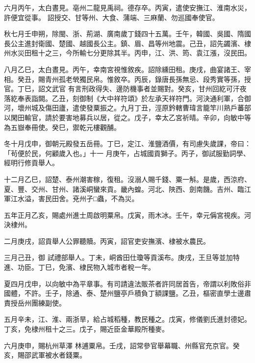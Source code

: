 \begin{pinyinscope}
 六月丙午，太白晝見。亳州二龍見禹祠。德存卒。丙寅，遣使安撫江、淮南水災，許便宜從事。
 詔授交、甘等州、大食、蒲端、三麻蘭、勿巡國奉使官。



 秋七月壬申朔，除閩、浙、荊湖、廣南歲丁錢四十五萬。壬午，韓國、吳國、隋國長公主進封衛國、楚國、越國長公主。鎮、眉、昌等州地震。己丑，詔先蠲濱、棣州水災田租十之三，今所輸七分更除其半。丙申，江、洪、筠、袁江漲，沒民田。



 八月乙巳，太白晝見。丙午，幸南宮視惟敘疾。詔除纁田租。庚戌，曲宴諸王、宰相。癸丑，賜青州孤老煢獨民帛。惟敘卒。丙辰，錄唐長孫無忌、段秀實等孫，授官。丁巳，詔文武官
 有言刑政得失、邊防機事者並賜對。癸亥，甘州回紇可汗夜落紇奉表詣闕。乙丑，刻御制《大中祥符頌》於左承天祥符門。河決通利軍，合御河，壞州城及傷田廬，遣使發粟振之。九月丁丑，涇原鈐轄曹瑋言籠竿川熟戶蕃部以閑田輸官，請於要害地募兵以居，從之。戊子，幸太乙宮祈晴。辛卯，向敏中等為五嶽奉冊使。癸巳，禦乾元樓觀酺。



 冬十月戊申，御朝元殿發五岳冊。丁巳，定江、淮鹽酒價，有司慮失歲課，帝曰：「茍便於民，何顧歲入也。」十一
 月庚午，占城國貢獅子。丙子，御試服勤詞學、經明行修貢舉人。



 十二月乙巳，詔楚、泰州潮害稼，復租。沒溺人賜千錢、粟一斛。是歲，西涼府、夏、豐、交州、甘州、諸溪峒蠻來貢。畿內蝗。河北、陜西、劍南饑。吉州、臨江軍江水溢，害民田舍。兗州孑□蟲，不為災。



 五年正月乙亥，賜處州進士周啟明粟帛。戊寅，雨木冰。壬午，幸元偁宮視疾。河決棣州。



 二月庚戌，詔貢舉人公罪聽贖。丙寅，詔官吏安撫濱、棣被水農民。



 三月己丑，御
 試禮部舉人。丁未，峒酋田仕瓊等貢溪布。庚戌，王旦等並加特進、功臣。丁巳，免濱、棣民物入城市者稅一年。



 夏四月戊申，以向敏中為平章事。有司請違法販茶者許同居首告，帝謂以利敗俗非國體，不許。壬子，除通、泰、楚州鹽亭戶積負丁額課鹽。乙丑，樞密直學士邊肅責授岳州團練副使。



 五月辛未，江、淮、兩浙旱，給占城稻種，教民種之。戊寅，修儀劉氏進封德妃。丁亥，免棣州租十之三。戊子，賜近臣金華殿所種麥。



 六月庚申，賜杭州草澤
 林逋粟帛。壬戌，詔常參官舉幕職、州縣官充京官。癸亥，賜邵武軍被水者錢粟。




\end{pinyinscope}
